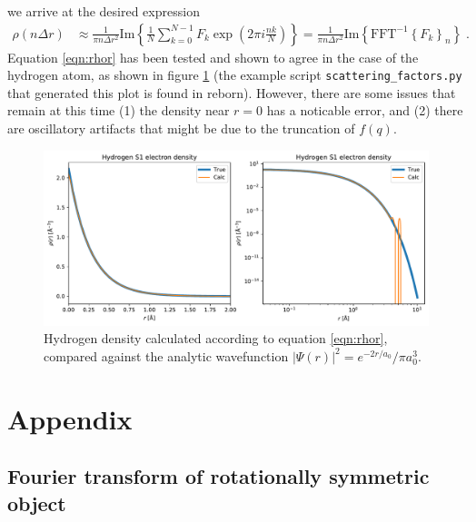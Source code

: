 \documentclass[11pt]{article}
\begin{document}
we arrive at the desired expression
\begin{align}\label{eqn:rhor}
\rho(n \Delta r) &\approx \frac{1}{\pi n \Delta r^2 } \text{Im} \left\{ \frac{1}{N}  \sum_{k=0}^{N-1}    F_k  \exp\left( 2\pi i \frac{nk}{ N} \right) \right\} = \frac{1}{\pi n \Delta r^2 } \text{Im}\left\{ \text{FFT}^{-1}\left\{ F_k \right\}_n\right\} \; .
\end{align}
Equation \ref{eqn:rhor} has been tested and shown to agree in the case of the hydrogen atom, as shown in figure \ref{fig:hydrogen} (the example script \texttt{scattering\_factors.py} that generated this plot is found in reborn).  However, there are some issues that remain at this time (1) the density near $r=0$ has a noticable error, and (2) there are oscillatory artifacts that might be due to the truncation of $f(q)$.

\begin{figure}[htbp]
   \centering
   \includegraphics[width=\textwidth]{figures/hydrogen_density_1.pdf} 
   \caption{Hydrogen density calculated according to equation \ref{eqn:rhor}, compared against the analytic wavefunction $|\Psi(r)|^2=e^{-2 r/a_0}/\pi a_0^3$.}
   \label{fig:hydrogen}
\end{figure}

\section{Appendix}

\subsection{Fourier transform of rotationally symmetric object}
\label{sec:3d1d}
\end{document}
